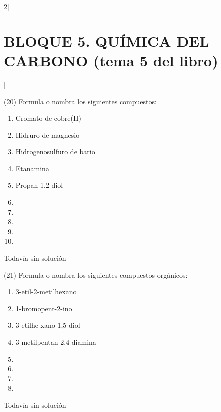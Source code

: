 \documentclass[10pt]{article}
\begin{document}
\begin{multicols}{2}[
  \section{BLOQUE 5. QUÍMICA DEL CARBONO (tema 5 del libro)}
  ]
\begin{exercise}[
    tags    = {},
    topics  = {química, química orgánica, orgánica},
    source  = {FQ 1B MGH 2016, p151, e20},
  ]
  (20) Formula o nombra los siguientes compuestos:
  \begin{enumerate}
    \item Cromato de cobre(II)
    \item Hidruro de magnesio
    \item Hidrogenosulfuro de bario
    \item Etanamina
    \item Propan-1,2-diol
    \item {}
    \item {}
    \item {}
    \item {}
    \item {}
  \end{enumerate}
\end{exercise}

\begin{solution}[print=false]
  Todavía sin solución
\end{solution}




\begin{exercise}[
    tags    = {},
    topics  = {química, química orgánica, orgánica},
    source  = {FQ 1B MGH 2016, p151, e21},
  ]
  (21) Formula o nombra los siguientes compuestos orgánicos:
  \begin{enumerate}
    \item 3-etil-2-metilhexano
    \item 1-bromopent-2-ino
    \item 3-etilhe xano-1,5-diol
    \item 3-metilpentan-2,4-diamina
    \item {}
    \item {}
    \item {}
    \item {}
  \end{enumerate}
\end{exercise}

\begin{solution}[print=false]
  Todavía sin solución
\end{solution}







\end{multicols}
\end{document}

